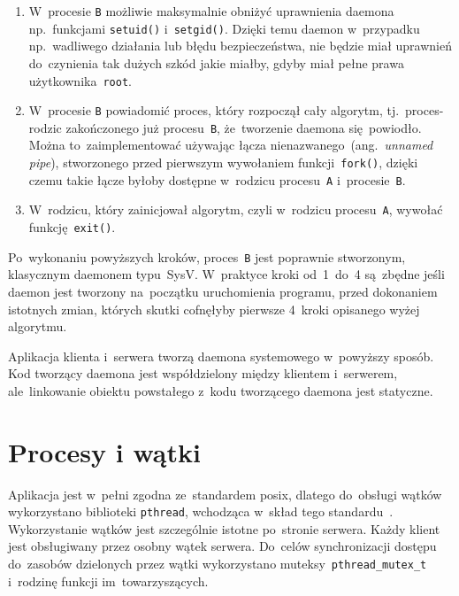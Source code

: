 \documentclass[thesis]{subfiles}
\begin{document}
\begin{enumerate}
	\item W~procesie \texttt{B} możliwie maksymalnie obniżyć uprawnienia daemona np.~funkcjami \texttt{setuid()} i~\texttt{setgid()}. Dzięki temu daemon w~przypadku np.~wadliwego działania lub błędu bezpieczeństwa, nie będzie miał uprawnień do~czynienia tak dużych szkód jakie miałby, gdyby miał pełne prawa użytkownika~\texttt{root}.
	\item W~procesie \texttt{B} powiadomić proces, który rozpoczął cały algorytm, tj.~proces-rodzic zakończonego już procesu~\texttt{B}, że~tworzenie daemona się~powiodło. Można to~zaimplementować używając łącza nienazwanego~(ang.~\emph{unnamed pipe}), stworzonego przed pierwszym wywołaniem funkcji~\texttt{fork()}, dzięki czemu takie łącze byłoby dostępne w~rodzicu procesu~\texttt{A} i~procesie~\texttt{B}.
	\item W~rodzicu, który zainicjował algorytm, czyli w~rodzicu procesu~\texttt{A}, wywołać funkcję~\texttt{exit()}.
\end{enumerate}
Po~wykonaniu powyższych kroków, proces~\texttt{B} jest poprawnie stworzonym, klasycznym daemonem typu~SysV. W~praktyce kroki od~1~do~4 są~zbędne jeśli daemon jest tworzony na~początku uruchomienia programu, przed dokonaniem istotnych zmian, których skutki cofnęłyby pierwsze 4~kroki opisanego wyżej algorytmu.

Aplikacja klienta i~serwera tworzą daemona systemowego w~powyższy sposób. Kod tworzący daemona jest współdzielony między klientem i~serwerem, ale~linkowanie obiektu powstałego z~kodu tworzącego daemona jest statyczne.


\section{Procesy i wątki}

Aplikacja jest w~pełni zgodna ze~standardem \gls{posix}, dlatego do~obsługi wątków wykorzystano biblioteki \texttt{pthread}, wchodząca w~skład tego standardu~\cite{pthreads-posix-manual}. Wykorzystanie wątków jest szczególnie istotne po~stronie serwera. Każdy klient jest obsługiwany przez osobny wątek serwera. Do~celów synchronizacji dostępu do~zasobów dzielonych przez wątki wykorzystano muteksy~\texttt{pthread\_mutex\_t} i~rodzinę funkcji im~towarzyszących.

\end{document}
